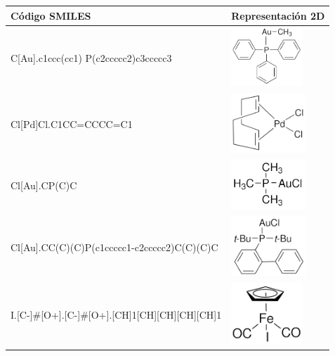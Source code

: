 \begin{landscape}
    \begin{table}
  \begin{minipage}{.5\linewidth}
    \centering
    \begin{tabular}{m{5cm}>{\centering\arraybackslash}m{4cm}}
        \hline
        \textbf{Código SMILES} & \textbf{Representación 2D} \\
        \hline
        C[Au].c1ccc(cc1) P(c2ccccc2)c3ccccc3 & \includegraphics[width=2.7cm]{imagenes/sigmaAldrich/Methyl(triphenylphosphine)gold(I)} \\ [0.8cm]
        \hline
        Cl[Pd]Cl.C1CC=CCCC=C1 & \includegraphics[width=2.8cm]{imagenes/sigmaAldrich/Dichloro(1,5-cyclooctadiene)palladium(II).png} \\ 
        \hline
        Cl[Au].CP(C)C & \includegraphics[width=2.8cm]{imagenes/sigmaAldrich/Chloro(trimethylphosphine)gold(I).png} \\ [0.8cm]
        \hline
         Cl[Au].CC(C)(C)P(c1ccccc1-c2ccccc2)C(C)(C)C & \includegraphics[width=2.8cm]{imagenes/sigmaAldrich/Chloro[(1,1-biphenyl-2-yl)di-tert-butylphosphine]gold(I).png} \\
        \hline
        [Fe]I.[C-]\#[O+].[C-]\#[O+].[CH]1[CH][CH][CH][CH]1 & \includegraphics[width=2.7cm]{imagenes/sigmaAldrich/Dicarbonylcyclopentadienyliodoiron(II).png} \\

\end{tabular}
\end{minipage}
\end{table}
\end{landscape}

